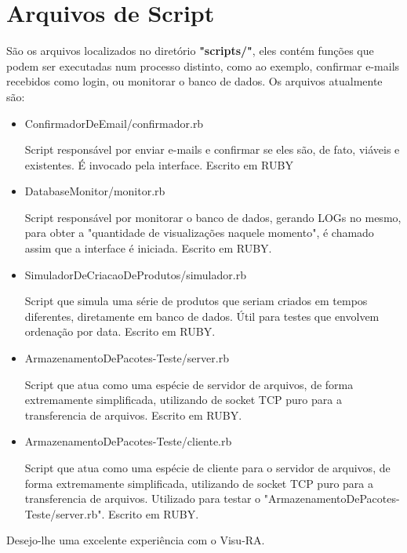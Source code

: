 \documentclass[onecolumn,12pt]{article}
\begin{document}
		\section{Arquivos de Script}
			São os arquivos localizados no diretório \textbf{"scripts/"}, eles contém funções que podem ser executadas num processo distinto, como ao exemplo, confirmar e-mails recebidos como login, ou monitorar o banco de dados. Os arquivos atualmente são:
			\begin{itemize}
				\item ConfirmadorDeEmail/confirmador.rb\par
					Script responsável por enviar e-mails e confirmar se eles são, de fato, viáveis e existentes. É invocado pela interface. Escrito em RUBY
				\item DatabaseMonitor/monitor.rb\par
					Script responsável por monitorar o banco de dados, gerando LOGs no mesmo, para obter a "quantidade de visualizações naquele momento", é chamado assim que a interface é iniciada. Escrito em RUBY.
				\item SimuladorDeCriacaoDeProdutos/simulador.rb\par
					Script que simula uma série de produtos que seriam criados em tempos diferentes, diretamente em banco de dados. Útil para testes que envolvem ordenação por data. Escrito em RUBY.
				\item ArmazenamentoDePacotes-Teste/server.rb\par
					Script que atua como uma espécie de servidor de arquivos, de forma extremamente simplificada, utilizando de socket TCP puro para a transferencia de arquivos. Escrito em RUBY.
				\item ArmazenamentoDePacotes-Teste/cliente.rb\par
					Script que atua como uma espécie de cliente para o servidor de arquivos, de forma extremamente simplificada, utilizando de socket TCP puro para a transferencia de arquivos. Utilizado para testar o "ArmazenamentoDePacotes-Teste/server.rb". Escrito em RUBY.
			\end{itemize}
				
    	

    \newpage
    \begin{large}
    	Desejo-lhe uma excelente experiência com o Visu-RA.
    \end{large}
\end{document}
